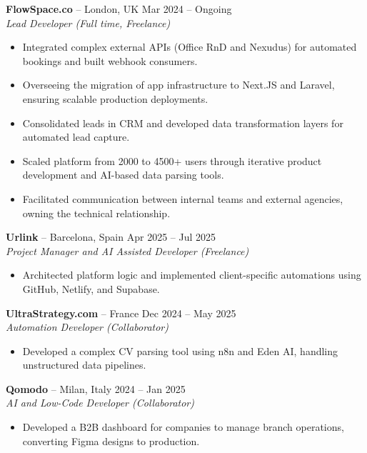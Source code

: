 \documentclass[10pt, a4paper]{article}
\begin{document}
\noindent \textbf{FlowSpace.co} -- London, UK \hfill Mar 2024 -- Ongoing \\
\textit{Lead Developer (Full time, Freelance)}
\begin{itemize}[leftmargin=0.15in, label={--}]
    \item Integrated complex external APIs (Office RnD and Nexudus) for automated bookings and built webhook consumers.
    \item Overseeing the migration of app infrastructure to Next.JS and Laravel, ensuring scalable production deployments.
    \item Consolidated leads in CRM and developed data transformation layers for automated lead capture.
    \item Scaled platform from 2000 to 4500+ users through iterative product development and AI-based data parsing tools.
    \item Facilitated communication between internal teams and external agencies, owning the technical relationship.
\end{itemize}

\noindent \textbf{Urlink} -- Barcelona, Spain \hfill Apr 2025 -- Jul 2025 \\
\textit{Project Manager and AI Assisted Developer (Freelance)}
\begin{itemize}[leftmargin=0.15in, label={--}]
    \item Architected platform logic and implemented client-specific automations using GitHub, Netlify, and Supabase.
\end{itemize}

\noindent \textbf{UltraStrategy.com} -- France \hfill Dec 2024 -- May 2025 \\
\textit{Automation Developer (Collaborator)}
\begin{itemize}[leftmargin=0.15in, label={--}]
    \item Developed a complex CV parsing tool using n8n and Eden AI, handling unstructured data pipelines.
\end{itemize}

\noindent \textbf{Qomodo} -- Milan, Italy \hfill 2024 -- Jan 2025 \\
\textit{AI and Low-Code Developer (Collaborator)}
\begin{itemize}[leftmargin=0.15in, label={--}]
    \item Developed a B2B dashboard for companies to manage branch operations, converting Figma designs to production.
\end{itemize}
\end{document}
